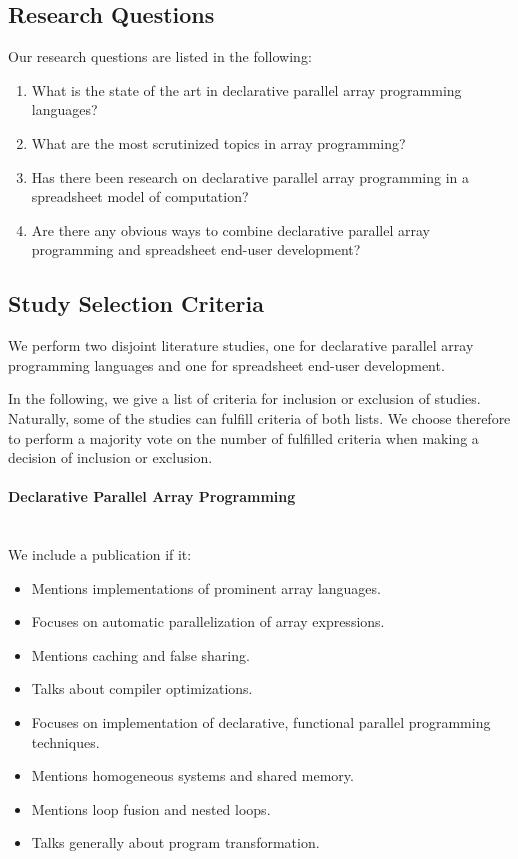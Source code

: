 \documentclass[a4paper]{article}
\begin{document}
\subsection{Research Questions}
\label{sec:research-questions}

Our research questions are listed in the following: 

\begin{enumerate}
\item What is the state of the art in declarative parallel array
  programming languages?
\item What are the most scrutinized topics in array programming?
\item Has there been research on declarative parallel array
  programming in a spreadsheet model of computation?
\item Are there any obvious ways to combine declarative parallel array
  programming and spreadsheet end-user development?
\end{enumerate}

\subsection{Study Selection Criteria}
\label{sec:study-select-crit}

We perform two disjoint literature studies, one for declarative
parallel array programming languages and one for spreadsheet end-user
development.

In the following, we give a list of criteria for inclusion or
exclusion of studies. Naturally, some of the studies can fulfill
criteria of both lists. We choose therefore to perform a majority vote
on the number of fulfilled criteria when making a decision of
inclusion or exclusion.

\paragraph{Declarative Parallel Array Programming}
~\\

We include a publication if it:

\begin{itemize}
\item Mentions implementations of prominent array languages.
\item Focuses on automatic parallelization of array expressions.
\item Mentions caching and false sharing.
\item Talks about compiler optimizations.
\item Focuses on implementation of declarative, functional parallel
  programming techniques.
\item Mentions homogeneous systems and shared memory.
\item Mentions loop fusion and nested loops.
\item Talks generally about program transformation.
\end{itemize}
\end{document}
